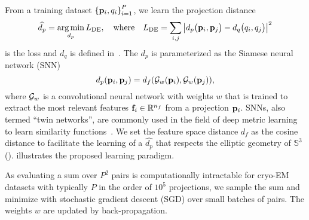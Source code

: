 From a training dataset ${\{ \mathbf{p}_i, q_i \}}_{i=1}^{P}$, we learn the projection distance
\begin{equation}
    \widehat{d_p} = \operatorname*{arg\,min}_{d_p} L_\text{DE},
    \quad \text{where} \quad
    L_\text{DE} = \sum_{i,j} \left| d_p\big(\mathbf{p}_i,\mathbf{p}_j\big) - d_q\big(q_i,q_j\big) \right|^2
    \label{eqn:distance-learning}
\end{equation}
is the loss and $d_q$ is defined in~.
The $d_p$ is parameterized as the Siamese neural network (SNN)~\cite{chopra2005learning}
\begin{equation*}
    d_p(\mathbf{p}_i, \mathbf{p}_j) = d_f(\mathcal{G}_w(\mathbf{p}_i), \mathcal{G}_w(\mathbf{p}_j)),
\end{equation*}
where $\mathcal{G}_w$ is a convolutional neural network with weights $w$ that is trained to extract the most relevant features $\mathbf{f}_i \in \mathbb{R}^{n_f}$ from a projection $\mathbf{p}_i$.
SNNs, also termed ``twin networks'', are commonly used in the field of deep metric learning to learn similarity functions~\cite{yi2014deep}.
We set the feature space distance $d_f$ as the cosine distance to facilitate the learning of a $\widehat{d_p}$ that respects the elliptic geometry of $\mathbb{S}^3$ ().
 illustrates the proposed learning paradigm.

As evaluating a sum over $P^2$ pairs is computationally intractable for cryo-EM datasets with typically $P$ in the order of $10^5$ projections, we sample the sum and minimize  with stochastic gradient descent (SGD) over small batches of pairs.
The weights $w$ are updated by back-propagation.

